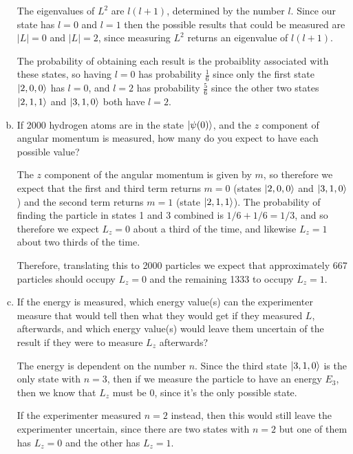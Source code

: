 \documentclass[10pt]{article}
\begin{document}
\begin{enumerate}[(a)]
        \begin{solution}
            The eigenvalues of $L^2$ are $l(l+1)$, determined by the number $l$. Since our state has $l = 0$ and $l = 1$ then the possible results that could be measured are $|L| = 0$ and $|L| = 2$, since measuring $L^2$ returns an eigenvalue of $l(l+1)$.

            The probability of obtaining each result is the probaiblity associated with these states, so having $l = 0$ has probability $\frac 16$ since only the first state $\ket{2, 0, 0}$ has $l = 0$, and $l = 2$ has probability $\frac 56$ since the other two states $\ket{2, 1, 1}$ and $\ket{3, 1, 0}$ both have $l = 2$.
        \end{solution}
        \item If 2000 hydrogen atoms are in the state $\ket{\psi(0)}$, and the $z$ component of angular momentum is measured, how many do you expect to have each possible value? 
        
        \begin{solution}
            The $z$ component of the angular momentum is given by $m$, so therefore we expect that the first and third term returns $m = 0$ (states $\ket {2, 0, 0}$ and $\ket{3, 1, 0}$) and the second term returns $m = 1$ (state $\ket{2, 1, 1}$). The probability of finding the particle in states 1 and 3 combined is $1/6 + 1/6 = 1/3$, and so therefore we expect $L_z = 0$ about a third of the time, and likewise $L_z = 1$ about two thirds of the time. 

            Therefore, translating this to 2000 particles we expect that approximately 667 particles should occupy $L_z = 0$ and the remaining 1333 to occupy $L_z = 1$. 
        \end{solution}
        \item If the energy is measured, which energy value(s) can the experimenter measure that would tell then what they would get if they measured $L$, afterwards, and which energy value(s) would leave them uncertain of the result if they were to measure $L_z$ afterwards? 
        
        \begin{solution}
            The energy is dependent on the number $n$. Since the third state $\ket{3, 1, 0}$ is the only state with $n = 3$, then if we measure the particle to have an energy $E_3$, then we know that $L_z$ must be 0, since it's the only possible state. 

            If the experimenter measured $n = 2$ instead, then this would still leave the experimenter uncertain, since there are two states with $n = 2$ but one of them has $L_z = 0$ and the other has $L_z = 1$.
        \end{solution}
    \end{enumerate}
\end{document}
